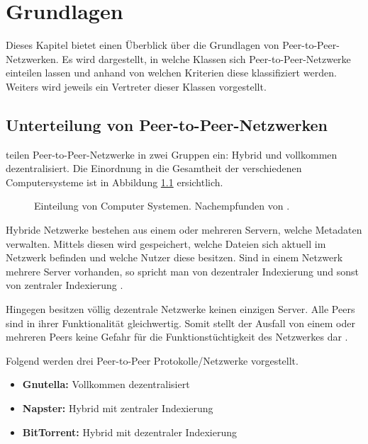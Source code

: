 \chapter{Grundlagen}
\label{cha:Grundlagen}
Dieses Kapitel bietet einen Überblick über die Grundlagen von Peer-to-Peer-Netz\-werken. Es wird dargestellt, in welche Klassen sich Peer-to-Peer-Netz\-werke einteilen lassen und anhand von welchen Kriterien diese klassifiziert werden. Weiters wird jeweils ein Vertreter dieser Klassen vorgestellt.

\section{Unterteilung von Peer-to-Peer-Netzwerken}
\textcite{pourebrahimi2005survey} teilen Peer-to-Peer-Netz\-werke in zwei Gruppen ein: Hybrid und vollkommen dezentralisiert. Die Einordnung in die Gesamtheit der verschiedenen Computersysteme ist in Abbildung \ref{fig:ComputerSystems} ersichtlich.

\begin{figure}[]
    \centering
    \caption{Einteilung von Computer Systemen. Nachempfunden von \textcite{pourebrahimi2005survey}. }
    \label{fig:ComputerSystems}
\end{figure}

Hybride Netzwerke bestehen aus einem oder mehreren Servern, welche Metadaten verwalten. Mittels diesen wird gespeichert, welche Dateien sich aktuell im Netzwerk befinden und welche Nutzer diese besitzen. Sind in einem Netzwerk mehrere Server vorhanden, so spricht man von dezentraler Indexierung und sonst von zentraler Indexierung \parencite{pourebrahimi2005survey}.

Hingegen besitzen völlig dezentrale Netzwerke keinen einzigen Server. Alle Peers sind in ihrer Funktionalität gleichwertig. Somit stellt der Ausfall von einem oder mehreren Peers keine Gefahr für die Funktionstüchtigkeit des Netzwerkes dar \parencite{pourebrahimi2005survey}. 

Folgend werden drei Peer-to-Peer Protokolle/Netzwerke vorgestellt. 
\begin{itemize}
    \item \textbf{Gnutella:} Vollkommen dezentralisiert
    \item \textbf{Napster:} Hybrid mit zentraler Indexierung
    \item \textbf{BitTorrent:} Hybrid mit dezentraler Indexierung
\end{itemize}

